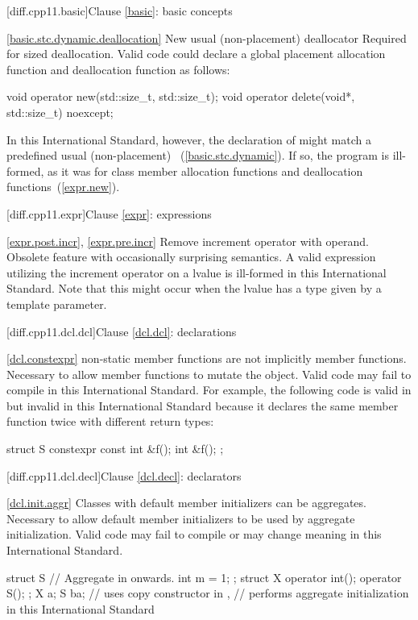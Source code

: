 [diff.cpp11.basic]{Clause \ref{basic}: basic concepts}

\ref{basic.stc.dynamic.deallocation}
\change New usual (non-placement) deallocator 
\rationale Required for sized deallocation.
\effect Valid \CppXI code could declare a global placement allocation function and
deallocation function as follows:

\begin{codeblock}
void operator new(std::size_t, std::size_t);
void operator delete(void*, std::size_t) noexcept;
\end{codeblock}

In this International Standard, however, the declaration of 
might match a predefined usual (non-placement)
~(\ref{basic.stc.dynamic}). If so, the
program is ill-formed, as it was for class member allocation functions and
deallocation functions~(\ref{expr.new}).

[diff.cpp11.expr]{Clause \ref{expr}: expressions}

\ref{expr.post.incr}, \ref{expr.pre.incr}
\change
Remove increment operator with  operand.
\rationale Obsolete feature with occasionally surprising semantics.
\effect A valid \CppXIV expression utilizing the increment operator on
a  lvalue is ill-formed in this International Standard.
Note that this might occur when the lvalue has a type given by a template
parameter.

[diff.cpp11.dcl.dcl]{Clause \ref{dcl.dcl}: declarations}

\ref{dcl.constexpr}
\change {} non-static member functions are not implicitly
 member functions.
\rationale Necessary to allow  member functions to mutate
the object.
\effect
Valid \CppXI code may fail to compile in this International Standard.
For example, the following code is valid in \CppXI
but invalid in this International Standard because it declares the same member
function twice with different return types:

\begin{codeblock}
struct S {
  constexpr const int &f();
  int &f();
};
\end{codeblock}

[diff.cpp11.dcl.decl]{Clause \ref{dcl.decl}: declarators}

\ref{dcl.init.aggr}
\change Classes with default member initializers can be aggregates.
\rationale Necessary to allow default member initializers to be used
by aggregate initialization.
\effect
Valid \CppXI code may fail to compile or may change meaning in this International Standard.
\begin{codeblock}
struct S { // Aggregate in \CppXIV onwards.
  int m = 1;
};
struct X {
  operator int();
  operator S();
};
X a{};
S b{a};  // uses copy constructor in \CppXI,
         // performs aggregate initialization in this International Standard
\end{codeblock}

